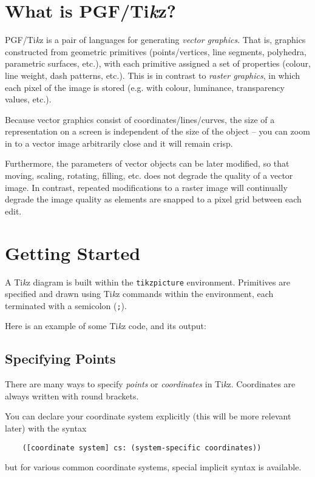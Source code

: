 \documentclass{article}
\theoremstyle{definition}
\theoremstyle{definition}
\theoremstyle{remark}
\newcommand{\Tikz}{Ti\textit{k}z{}}
\begin{document}
\scalebox{0.8}{\theverbbox}

\newpage

\section*{What is PGF/\Tikz{}?}

PGF/\Tikz{} is a pair of languages for generating \textit{vector graphics}. That is, graphics constructed from geometric primitives (points/vertices, line segments, polyhedra, parametric surfaces, etc.), with each primitive assigned a set of properties (colour, line weight, dash patterns, etc.). This is in contrast to \textit{raster graphics}, in which each pixel of the image is stored (e.g. with colour, luminance, transparency values, etc.).

Because vector graphics consist of coordinates/lines/curves, the size of a representation on a screen is independent of the size of the object -- you can zoom in to a vector image arbitrarily close and it will remain crisp.

Furthermore, the parameters of vector objects can be later modified, so that moving, scaling, rotating, filling, etc. does not degrade the quality of a vector image. In contrast, repeated modifications to a raster image will continually degrade the image quality as elements are snapped to a pixel grid between each edit.

\section*{Getting Started}

A \Tikz{} diagram is built within the \verb|tikzpicture| environment. Primitives are specified and drawn using \Tikz{} commands within the environment, each terminated with a semicolon (\verb|;|).

Here is an example of some \Tikz{} code, and its output:


\subsection*{Specifying Points}

There are many ways to specify \textit{points} or \textit{coordinates} in \Tikz{}. Coordinates are always written with round brackets.

You can declare your coordinate system explicitly (this will be more relevant later) with the syntax
\begin{verbatim}
    ([coordinate system] cs: (system-specific coordinates))
\end{verbatim}
but for various common coordinate systems, special implicit syntax is available.
\end{document}

